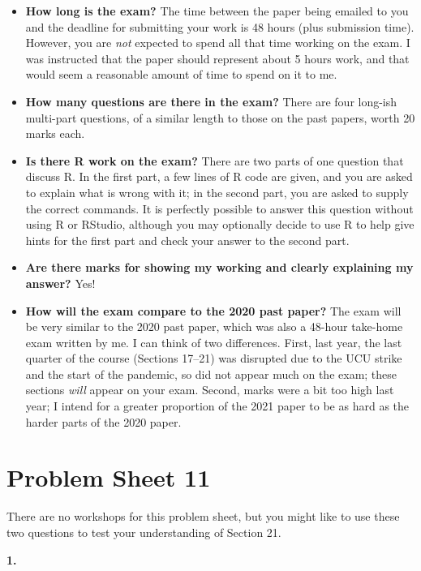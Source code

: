\documentclass[
  a4paper,
]{article}
\providecommand{\tightlist}{%
  \setlength{\itemsep}{0pt}\setlength{\parskip}{0pt}}
\newif\ifcomm\commtrue
\theoremstyle{definition}
\theoremstyle{definition}
\theoremstyle{definition}
\theoremstyle{remark}
\begin{document}
\begin{itemize}
\tightlist
\item
  \textbf{How long is the exam?} The time between the paper being emailed to you and the deadline for submitting your work is 48 hours (plus submission time). However, you are \emph{not} expected to spend all that time working on the exam. I was instructed that the paper should represent about 5 hours work, and that would seem a reasonable amount of time to spend on it to me.
\item
  \textbf{How many questions are there in the exam?} There are four long-ish multi-part questions, of a similar length to those on the past papers, worth 20 marks each.
\item
  \textbf{Is there R work on the exam?} There are two parts of one question that discuss R. In the first part, a few lines of R code are given, and you are asked to explain what is wrong with it; in the second part, you are asked to supply the correct commands. It is perfectly possible to answer this question without using R or RStudio, although you may optionally decide to use R to help give hints for the first part and check your answer to the second part.
\item
  \textbf{Are there marks for showing my working and clearly explaining my answer?} Yes!
\item
  \textbf{How will the exam compare to the 2020 past paper?} The exam will be very similar to the 2020 past paper, which was also a 48-hour take-home exam written by me. I can think of two differences. First, last year, the last quarter of the course (Sections 17--21) was disrupted due to the UCU strike and the start of the pandemic, so did not appear much on the exam; these sections \emph{will} appear on your exam. Second, marks were a bit too high last year; I intend for a greater proportion of the 2021 paper to be as hard as the harder parts of the 2020 paper.
\end{itemize}

\hypertarget{P11}{%
\section*{Problem Sheet 11}\label{P11}}

\commtrue

There are no workshops for this problem sheet, but you might like to use these two questions to test your understanding of Section 21.

\textbf{1.}
\end{document}
